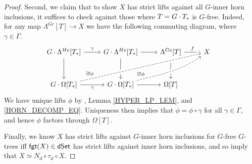 \documentclass[a4paper,10pt
,draft
]{article}%
\begin{document}
\begin{proof}
      Second, we claim
      that to show $X$ has strict lifts against all $G$-inner horn inclusions,
      it suffices to check against those where $T = G \cdot T_{\**}$ is $G$-free.
      Indeed, for any map \mbox{$\Lambda^{G e}[T] \to X$}
      we have the following commuting diagram, where 
      $\gamma \in \Gamma$.
      \begin{equation}
            \begin{tikzcd}[row sep = 3em]
                  G \cdot \Lambda^{H e}[T_*] \arrow[d] \arrow[r, "\gamma"]
                  &
                  G \cdot \Lambda^{H e}[T_*] \arrow[r] \arrow[d]
                  &
                  \Lambda^{G e}[T] \arrow[r, "f"] \arrow[d]
                  &
                  X
                  \\
                  G \cdot \Omega[T_*] \arrow[r, "\gamma"']
                  \arrow[urrr, very near start, crossing over, dashed, "\exists! \phi"]
                  &
                  G \cdot \Omega[T_*] \arrow[r]
                  \arrow[urr, dashed, very near start, crossing over, out=15, in=-145, "\exists! \phi"]
                  &
                  \Omega[T]
            \end{tikzcd}
      \end{equation}
      We have unique lifts $\phi$ by
      \cite[Lemma 5.1]{MW09}, Lemma \ref{HYPER_LP_LEM}, and \eqref{HORN_DECOMP_EQ}.
      Uniqueness then implies that $\phi = \phi \circ \gamma $ for all $\gamma \in \Gamma$, and hence $\phi$ factors through $\Omega[T]$.
      
      Finally, we know $X$ has strict lifts against $G$-inner horn inclusions for $G$-free $G$-trees iff
      $\mathsf{fgt}(X) \in \mathsf{dSet}$ has strict lifts against inner horn inclusions,
      and so \cite[Theorem 6.1, Proposition 6.10]{MW09} imply that
      $X \simeq N_d \circ \tau_d \circ X$.
\end{proof}
\end{document}
